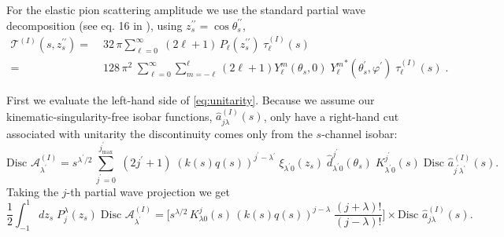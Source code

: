 \documentclass[10pt, aps,prd,amsmath,amssymb,superscriptaddress,onecolumn,
nofootinbib,showpacs,preprintnumbers]{revtex4-1}
\newcommand{\jpmax}{{j^\prime_\text{max}}}
\newcommand{\jp}{{j^\prime}}
\newcommand{\Disc}{\text{Disc }}
\newcommand{\lamp}{{\lambda^\prime}}
\begin{document}
For the elastic pion scattering amplitude we use the standard partial wave decomposition (see eq. 16 in \cite{Danilkin:2014cra}), using \( z_s^{\prime\prime} = \cos \theta_s^{\prime\prime}\),
  \begin{align}
    \label{eq:elastic-pion}
    \mathcal{T}^{(I)}(s, z_s^{\prime\prime}) =& \; 32 \, \pi \sum_{\ell=0  }^\infty \; (2\ell+1) \, P_{\ell}(z_s^{\prime\prime}) \; \tau_\ell^{(I)}(s) \nonumber \\
    =& \; 128 \, \pi^2 \; \sum_{\ell=0}^\infty \sum_{m=-\ell}^{\ell} (2\ell +1 ) Y^m_\ell(\theta_s,0) \; {Y^m_\ell}^*(\theta_s^\prime, \varphi^\prime) \; \tau_\ell^{(I)}(s) \; .
  \end{align}

First we evaluate the left-hand side of \cref{eq:unitarity}. Because we assume our kinematic-singularity-free isobar functions, \(\hat{a}^{(I)}_{j \lambda}(s)\), only have a right-hand cut associated with unitarity the discontinuity comes only from the \(s\)-channel isobar:
  \begin{equation}
    \label{eq:discontinuity}
    \Disc \mathcal{A}^{(I)}_\lamp = s^{\lamp/2}\, \sum_{j^\prime=0}^\jpmax \; (2 j^\prime +1) \; (k(s)q(s))^{j^\prime-\lamp}  \; \xi_{\lamp 0}(z_s)
    \; \hat{d}^{j^\prime}_{\lamp 0}(\theta_s) \; K^{j^\prime}_{\lamp0}(s) \; \Disc \hat{a}^{(I)}_{\jp \lamp}(s).
  \end{equation}
Taking the \(j\)-th partial wave projection we get
  \begin{equation}
    \label{eq:pw-disc}
    \frac{1}{2} \int_{-1}^1 dz_s \; P^\lambda_{j}(z_s) \; \Disc \mathcal{A}^{(I)}_\lamp =
    \bigg[ s^{\lambda/2} \, K^j_{\lambda 0}(s) \, (k(s)q(s))^{j-\lambda} \; \frac{(j+\lambda)!}{(j-
    \lambda)!} \bigg] \times \Disc \hat{a}^{(I)}_{j\lambda}(s).
  \end{equation}
\end{document}
